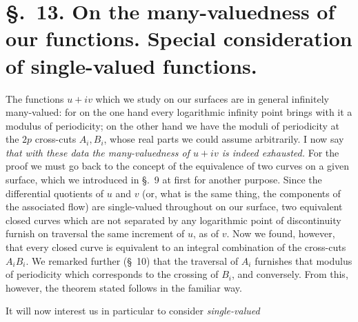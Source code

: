\documentclass{article}
\begin{document}
\section*{§.~13. On the many-valuedness of our functions. Special consideration of single-valued functions.}

The functions $u + iv$ which we study on our surfaces are in general infinitely many-valued: for on the one hand every logarithmic infinity point brings with it a modulus of periodicity; on the other hand we have the moduli of periodicity at the $2p$ cross-cuts $A_{i}, B_{i}$, whose real parts we could assume arbitrarily. I now say \emph{that with these data the many-valuedness of $u + iv$ is indeed exhausted.} For the proof we must go back to the concept of the equivalence of two curves on a given surface, which we introduced in §.~9 at first for another purpose. Since the differential quotients of $u$ and $v$ (or, what is the same thing, the components of the associated flow) are single-valued throughout on our surface, two equivalent closed curves which are not separated by any logarithmic point of discontinuity furnish on traversal the same increment of $u$, as of $v$. Now we found, however, that every closed curve is equivalent to an integral combination of the cross-cuts $A_{i}B_{i}$. We remarked further (§~10) that the traversal of $A_{i}$ furnishes that modulus of periodicity which corresponds to the crossing of $B_{i}$, and conversely. From this, however, the theorem stated follows in the familiar way.

It will now interest us in particular to consider \emph{single-valued}
\end{document}
